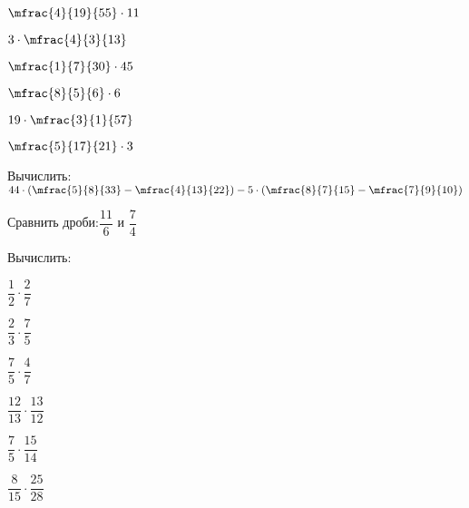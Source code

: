 \begin{homework}[number=1]
\begin{listofex}
\begin{enumcols}[itemcolumns=4]
			\item \( \mfrac{4}{19}{55}\cdot11 \)
			\item \( 3\cdot\mfrac{4}{3}{13} \)
			\item \( \mfrac{1}{7}{30}\cdot45 \)
			\item \( \mfrac{8}{5}{6}\cdot6 \)
			\item \( 19\cdot\mfrac{3}{1}{57} \)
			\item \( \mfrac{5}{17}{21}\cdot3 \)
		\end{enumcols}
		\item Вычислить:\quad\( 44\cdot\left( \mfrac{5}{8}{33}-\mfrac{4}{13}{22} \right)-5\cdot\left( \mfrac{8}{7}{15}-\mfrac{7}{9}{10} \right) \)
		\item Сравнить дроби:\quad\( \dfrac{11}{6} \) и \( \dfrac{7}{4} \)
		\item Вычислить:
		\begin{enumcols}[itemcolumns=3]
			\item \( \dfrac{1}{2}\cdot\dfrac{2}{7} \)
			\item \( \dfrac{2}{3}\cdot\dfrac{7}{5} \)
			\item \( \dfrac{7}{5}\cdot\dfrac{4}{7} \)
			\item \( \dfrac{12}{13}\cdot\dfrac{13}{12} \)
			\item \( \dfrac{7}{5}\cdot\dfrac{15}{14} \)
			\item \( \dfrac{8}{15}\cdot\dfrac{25}{28} \)
		\end{enumcols}
		
	\end{listofex}
\end{homework}

